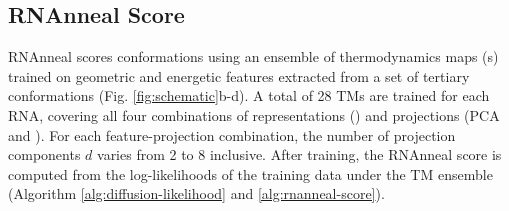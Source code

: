 \documentclass[%
aip,
 amsmath,amssymb,
reprint,%
onecolumn,
]{revtex4-1}
\makeatletter
\newcommand\setcurrentname[1]{\def\@currentlabelname{#1}}
\makeatother
\begin{document}
{%


\subsection*{RNAnneal Score}
\setcurrentname{RNAnneal Score} 
\label{sec:rnanneal}            

RNAnneal scores conformations using an ensemble of thermodynamics maps (s) trained on geometric and energetic features extracted from a set of tertiary conformations (Fig. \ref{fig:schematic}b-d). A total of 28 TMs are trained for each RNA, covering all four combinations of representations () and projections (PCA and ). For each feature-projection combination, the number of projection components $d$ varies from 2 to 8 inclusive. After training, the RNAnneal score is computed from the log-likelihoods of the training data under the TM ensemble (Algorithm \ref{alg:diffusion-likelihood} and \ref{alg:rnanneal-score}).

}
\end{document}
